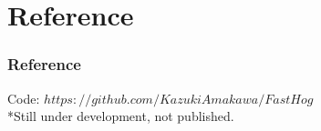 \documentclass{beamer}
\begin{document}
\section{Reference}
\begin{frame}
\frametitle{Reference}
\noindent Code: \texttt{$https://github.com/KazukiAmakawa/FastHog$}\\
*Still under development, not published.\\[4ex]




\end{frame}
\end{document}
